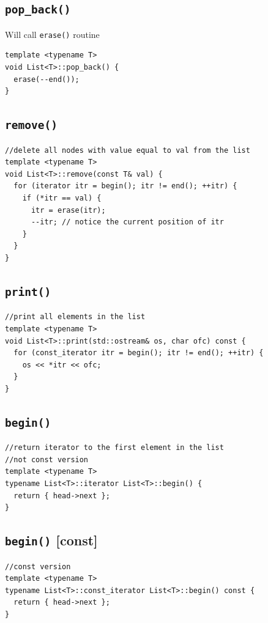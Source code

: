 \documentclass[11pt]{book}
\begin{document}
\subsection{\texttt{pop\_back()}}
\label{sec:orgcd5b9f1}
Will call \texttt{erase()} routine
\begin{verbatim}
template <typename T>
void List<T>::pop_back() {
  erase(--end());
}
\end{verbatim}
\subsection{\texttt{remove()}}
\label{sec:orge56c63c}
\begin{verbatim}
//delete all nodes with value equal to val from the list
template <typename T>
void List<T>::remove(const T& val) {
  for (iterator itr = begin(); itr != end(); ++itr) {
    if (*itr == val) {
      itr = erase(itr);
      --itr; // notice the current position of itr 
    }
  }
}
\end{verbatim}
\subsection{\texttt{print()}}
\label{sec:orgda110ba}
\begin{verbatim}
//print all elements in the list
template <typename T>
void List<T>::print(std::ostream& os, char ofc) const {
  for (const_iterator itr = begin(); itr != end(); ++itr) {
    os << *itr << ofc;
  }
}
\end{verbatim}
\subsection{\texttt{begin()}}
\label{sec:org75b5bc3}
\begin{verbatim}
//return iterator to the first element in the list
//not const version
template <typename T>
typename List<T>::iterator List<T>::begin() {
  return { head->next };
}
\end{verbatim}
\subsection{\texttt{begin()} [const]}
\label{sec:org6c3a1ef}
\begin{verbatim}
//const version 
template <typename T>
typename List<T>::const_iterator List<T>::begin() const {
  return { head->next };
}
\end{verbatim}
\end{document}
